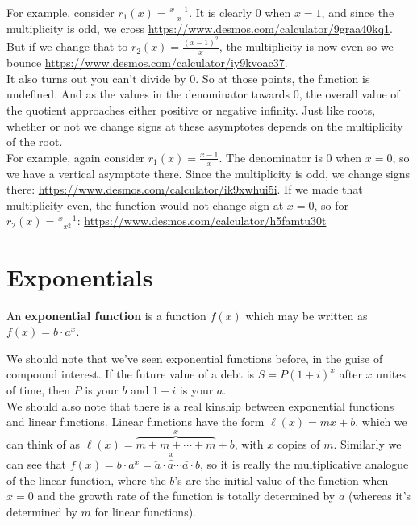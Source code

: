 For example, consider $r_1(x)=\frac{x-1}{x}$.  It is clearly 0 when $x=1$, and since the multiplicity is odd, we cross \url{https://www.desmos.com/calculator/9graa40kq1}.  But if we change that to $r_2(x)=\frac{(x-1)^2}{x}$, the multiplicity is now even so we bounce \url{https://www.desmos.com/calculator/iy9kvoac37}.\\

It also turns out you can't divide by 0.  So at those points, the function is undefined.  And as the values in the denominator towards 0, the overall value of the quotient approaches either positive or negative infinity.  Just like roots, whether or not we change signs at these asymptotes depends on the multiplicity of the root.\\




For example, again consider $r_1(x)=\frac{x-1}{x}$.  The denominator is 0 when $x=0$, so we have a vertical asymptote there.  Since the multiplicity is odd, we change signs there: \url{https://www.desmos.com/calculator/ik9xwhui5i}.  If we made that multiplicity even, the function would not change sign at $x=0$, so for $r_2(x)=\frac{x-1}{x^2}$: \url{https://www.desmos.com/calculator/h5famtu30t}






\section{Exponentials}\label{Section:Exponentials}

\begin{definition}
An \textbf{exponential function} is a function $f(x)$ which may be written as $f(x)=b\cdot a^x$.
\end{definition}

We should note that we've seen exponential functions before, in the guise of compound interest.  If the future value of a debt is $S=P(1+i)^x$ after $x$ unites of time, then $P$ is your $b$ and $1+i$ is your $a$.\\

We should also note that there is a real kinship between exponential functions and linear functions.  Linear functions have the form $\ell(x)=mx+b$, which we can think of as $\ell(x)=\overbrace{m+m+\cdots+m}^x+b$, with $x$ copies of $m$.  Similarly we can see that $f(x)=b\cdot a^x=\overbrace{a\cdot a\cdots a}^x\cdot b$, so it is really the multiplicative analogue of the linear function, where the $b$'s are the initial value of the function when $x=0$ and the growth rate of the function is totally determined by $a$ (whereas it's determined by $m$ for linear functions).\\

